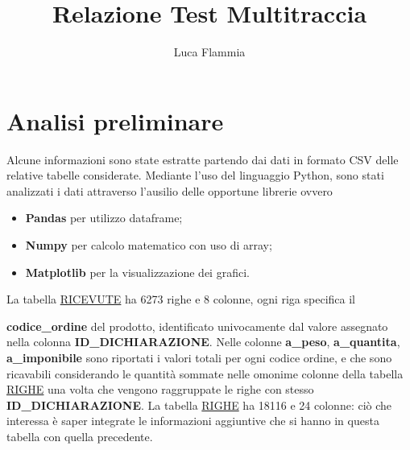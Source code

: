 \documentclass[10pt,a4paper]{report}
\title{Relazione Test Multitraccia}
\author{Luca Flammia}
\begin{document}
\maketitle
\section*{Analisi preliminare}
Alcune informazioni sono state estratte partendo dai dati in formato CSV delle relative tabelle considerate. Mediante l'uso del linguaggio Python, sono stati analizzati i dati attraverso l'ausilio delle opportune librerie ovvero
\begin{itemize}
\item \textbf{Pandas} per utilizzo dataframe; 
\item \textbf{Numpy} per calcolo matematico con uso di array;
\item \textbf{Matplotlib} per la visualizzazione dei grafici. 
\end{itemize}
La tabella \underline{RICEVUTE} ha 6273 righe e 8 colonne, ogni riga specifica il 

\textbf{codice\_ordine} del prodotto, identificato univocamente dal valore assegnato nella colonna \textbf{ID\_DICHIARAZIONE}. Nelle colonne \textbf{a\_peso}, \textbf{a\_quantita}, \textbf{a\_imponibile} sono riportati i valori totali per ogni codice ordine, e che sono ricavabili considerando le quantità sommate nelle omonime colonne della tabella \underline{RIGHE} una volta che vengono raggruppate le righe con stesso \textbf{ID\_DICHIARAZIONE}.
La tabella \underline{RIGHE} ha 18116 e 24 colonne: ciò che interessa è saper integrate le informazioni aggiuntive che si hanno in questa tabella con quella precedente.
\end{document}
